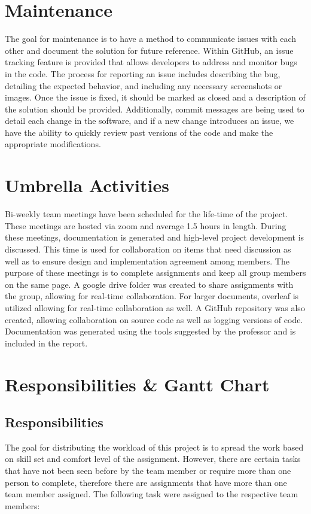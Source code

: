 \section{Maintenance}
The goal for maintenance is to have a method to communicate issues with each other and document the solution for future reference. Within GitHub, an issue tracking feature is provided that allows developers to address and monitor bugs in the code. The process for reporting an issue includes describing the bug, detailing the expected behavior, and including any necessary screenshots or images. Once the issue is fixed, it should be marked as closed and a description of the solution should be provided. Additionally, commit messages are being used to detail each change in the software, and if a new change introduces an issue, we have the ability to quickly review past versions of the code and make the appropriate modifications.

\section{Umbrella Activities}
Bi-weekly team meetings have been scheduled for the life-time of the project. These meetings are hosted via zoom and average 1.5 hours in length. During these meetings, documentation is generated and high-level project development is discussed. This time is used for collaboration on items
that need discussion as well as to ensure design and implementation agreement among members. The purpose of these meetings is to complete assignments and keep all group members on the same page. 
A google drive folder was created to share assignments with the group, allowing  for real-time collaboration. For larger documents, overleaf is utilized allowing for real-time collaboration as well. A GitHub repository was also created, allowing collaboration on source code as well as logging versions of code. Documentation was generated using the tools suggested by the professor and is included in the report.

\section{Responsibilities \& Gantt Chart}

\subsection{Responsibilities}
The goal for distributing the workload of this project is to spread the work based on skill set and comfort level of the assignment. However, there are certain tasks that have not been seen before by the team member or require more than one person to complete, therefore there are assignments that have more than one team member assigned. The following task were assigned to the respective team members: 

